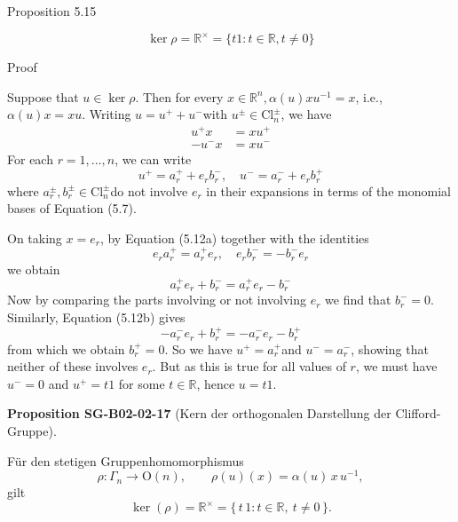 \documentclass[10pt, letterpaper]{article}
\newcommand{\R}{\mathbb{R}}
\newcommand{\CustomHeading}[3]{%
  \par\medskip\noindent%
  \textbf{#1 #2} \textnormal{(#3)}.\enskip%
}
\newenvironment{PROP}[2]{\begin{unitbox}\CustomHeading{Proposition}{#1}{#2}}{\end{unitbox}}
\begin{document}
Proposition 5.15


$$
\operatorname{ker} \rho=\mathbb{R}^{\times}=\{t 1: t \in \mathbb{R}, t \neq 0\}
$$



Proof

Suppose that $u \in \operatorname{ker} \rho$. Then for every $x \in \mathbb{R}^{n}, \alpha(u) x u^{-1}=x$, i.e., $\alpha(u) x=x u$. Writing $u=u^{+}+u^{-}$with $u^{ \pm} \in \mathrm{Cl}_{n}^{ \pm}$, we have
$$
\begin{aligned}
u^{+} x & =x u^{+} \\
-u^{-} x & =x u^{-}
\end{aligned}
$$
For each $r=1, \ldots, n$, we can write
$$
u^{+}=a_{r}^{+}+e_{r} b_{r}^{-}, \quad u^{-}=a_{r}^{-}+e_{r} b_{r}^{+}
$$
where $a_{r}^{ \pm}, b_{r}^{ \pm} \in \mathrm{Cl}_{n}^{ \pm}$do not involve $e_{r}$ in their expansions in terms of the monomial bases of Equation (5.7).

On taking $x=e_{r}$, by Equation (5.12a) together with the identities
$$
e_{r} a_{r}^{+}=a_{r}^{+} e_{r}, \quad e_{r} b_{r}^{-}=-b_{r}^{-} e_{r}
$$
we obtain
$$
a_{r}^{+} e_{r}+b_{r}^{-}=a_{r}^{+} e_{r}-b_{r}^{-}
$$
Now by comparing the parts involving or not involving $e_{r}$ we find that $b_{r}^{-}=0$. Similarly, Equation (5.12b) gives
$$
-a_{r}^{-} e_{r}+b_{r}^{+}=-a_{r}^{-} e_{r}-b_{r}^{+}
$$
from which we obtain $b_{r}^{+}=0$. So we have $u^{+}=a_{r}^{+}$and $u^{-}=a_{r}^{-}$, showing that neither of these involves $e_{r}$. But as this is true for all values of $r$, we must have $u^{-}=0$ and $u^{+}=t 1$ for some $t \in \mathbb{R}$, hence $u=t 1$.




\begin{PROP}{SG-B02-02-17}{Kern der orthogonalen Darstellung der Clifford-Gruppe}
Für den stetigen Gruppenhomomorphismus
\[
\rho : \Gamma_n \longrightarrow \mathrm{O}(n), \qquad 
\rho(u)(x) = \alpha(u)\, x\, u^{-1},
\]
gilt
\[
\ker(\rho) = \R^{\times} = \{\, t\,1 : t \in \R,\ t \neq 0 \,\}.
\]
\end{PROP}
\end{document}
